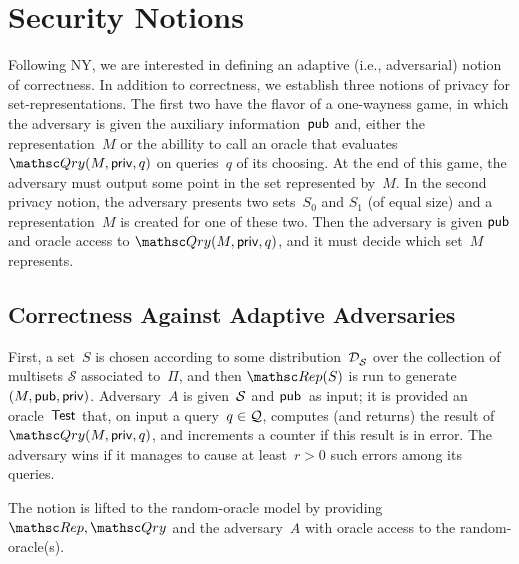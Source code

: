 \section{Security Notions}
\label{sec:security-notions}
Following NY, we are interested in defining an adaptive (i.e.,
adversarial) notion of correctness.   
In addition to correctness, we establish three notions of privacy for
set-representations. The first two have the flavor of a one-wayness game, in which the adversary is given the auxiliary information~${\sf pub}$ and, either the representation~$M$ or the abillity to call an oracle that evaluates $\Qry(M,\privaux,q)$ on queries~$q$ of its choosing.  At the end of this game, the adversary must output some point in the set represented by~$M$.  In the second privacy notion, the adversary presents two sets~$S_0$ and $S_1$ (of equal size) and a representation~$M$ is created for one of these two. Then the adversary is given ${\sf pub}$ and oracle access to $\Qry(M,\privaux,q)$, and it must decide which set~$M$ represents.

\subsection{Correctness Against Adaptive Adversaries}

First, a set~$S$ is chosen according to some
distribution~$\mathcal{D}_{{\cal S}}^{}$ over the collection of multisets
$\mathcal{S}$ associated to~$\Pi$, and then
$\Rep(S)$ is run to generate $(M,{\sf pub},{\sf priv})$.
Adversary~$A$ is given~${\cal S}$ and ${\sf pub}$~as input; it is
provided an oracle~$\mathsf{Test}$ that, on input a query~$q \in {\cal Q}$,
computes (and returns) the result of $\Qry(M,\privaux,q)$, and increments
a counter if this result is in error.  The adversary wins if it
manages to cause at least~$r>0$ such errors among its queries.

The notion is lifted to the random-oracle model by providing
$\Rep,\Qry$ and the adversary~$A$ with oracle access to the
random-oracle(s).



